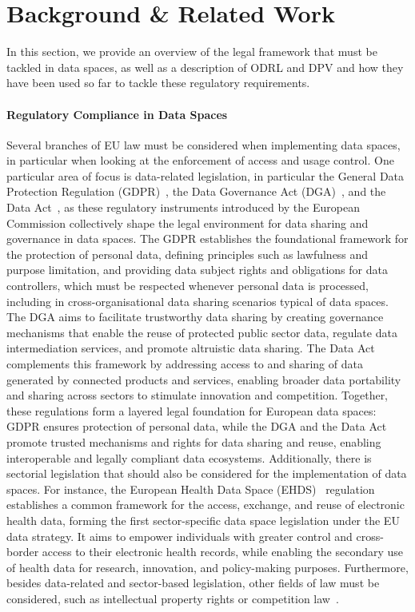 \section{Background \& Related Work}
\label{sec:background}

In this section,
we provide an overview of the legal framework
that must be tackled in data spaces,
as well as a description of ODRL and DPV
and how they have been used so far
to tackle these regulatory requirements.

\paragraph{Regulatory Compliance in Data Spaces}

Several branches of EU law must be considered
when implementing data spaces,
in particular when looking at the
enforcement of access and usage control.
One particular area of focus is
data-related legislation,
in particular the
General Data Protection Regulation (GDPR)~\cite{gdpr},
the Data Governance Act (DGA)~\cite{dga},
and the Data Act~\cite{data_act}, as
these regulatory instruments introduced by the European Commission
collectively shape the legal environment
for data sharing and governance in data spaces.
The GDPR establishes the foundational framework
for the protection of personal data,
defining principles such as lawfulness and purpose limitation,
and providing data subject rights
and obligations for data controllers,
which must be respected whenever personal data is processed,
including in cross-organisational data sharing scenarios typical of data spaces.
The DGA aims to facilitate trustworthy data sharing
by creating governance mechanisms that enable the reuse of
protected public sector data,
regulate data intermediation services,
and promote altruistic data sharing.
The Data Act complements this framework
by addressing access to and sharing of data
generated by connected products and services,
enabling broader data portability and sharing
across sectors to stimulate innovation and competition.
Together,
these regulations form a layered legal foundation
for European data spaces:
GDPR ensures protection of personal data,
while the DGA and the Data Act promote trusted mechanisms
and rights for data sharing and reuse,
enabling interoperable and legally compliant data ecosystems.
Additionally,
there is sectorial legislation
that should also be considered for the
implementation of data spaces.
For instance,
the European Health Data Space (EHDS)~\cite{ehds} regulation
establishes a common framework for the access,
exchange, and reuse of electronic health data,
forming the first sector-specific data space legislation
under the EU data strategy.
It aims to empower individuals with greater control and
cross-border access to their electronic health records,
while enabling the secondary use of health data for research,
innovation, and policy-making purposes.
Furthermore,
besides data-related and sector-based legislation,
other fields of law must be considered,
such as intellectual property rights or
competition law~\cite{data_spaces_support_centre_summary_2026}.

